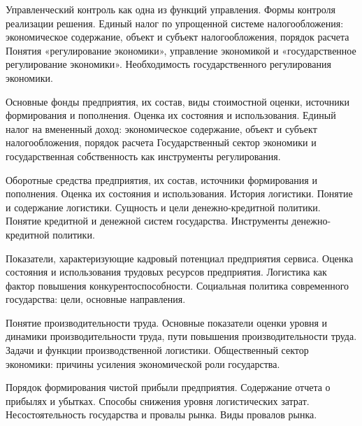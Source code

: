 \documentclass[
	11pt,
	a4paper,
	]
	{article}
\begin{document}
\bigskip

\noindent{} 
	{
		Управленческий контроль как одна из функций управления. Формы контроля реализации решения.
	}{
		Единый налог по упрощенной системе налогообложения: экономическое содержание, объект и субъект налогообложения, порядок расчета
	}{
		Понятия «регулирование экономики», управление экономикой и «государственное регулирование экономики». Необходимость государственного регулирования экономики.
	}

\bigskip

\noindent{} 
	{
		Основные фонды предприятия, их состав, виды стоимостной оценки, источники формирования и пополнения. Оценка их состояния и использования.
	}{
		Единый налог на вмененный доход: экономическое содержание, объект и субъект налогообложения, порядок расчета
	}{
		Государственный сектор экономики и государственная собственность как инструменты регулирования.
	}

\bigskip

\noindent{} 
	{
		Оборотные средства предприятия, их состав, источники формирования и пополнения. Оценка их состояния и использования.
	}{
		История логистики. Понятие и содержание логистики.
	}{
		Сущность и цели денежно-кредитной политики. Понятие кредитной и денежной систем государства. Инструменты денежно-кредитной политики.
	}

\bigskip

\noindent{} 
	{
		Показатели, характеризующие кадровый потенциал предприятия сервиса. Оценка состояния и использования трудовых ресурсов предприятия.
	}{
		Логистика как фактор повышения конкурентоспособности.
	}{
		Социальная политика современного государства: цели, основные направления.
	}

\bigskip

\noindent{} 
	{
		Понятие производительности труда. Основные показатели оценки уровня и динамики производительности труда, пути повышения производительности труда.
	}{
		Задачи и функции производственной логистики.
	}{
		Общественный сектор экономики: причины усиления экономической роли государства.
	}

\bigskip

\noindent{} 
	{
		Порядок формирования чистой прибыли предприятия. Содержание отчета о прибылях и убытках.
	}{
		Способы снижения уровня логистических затрат.
	}{
		Несостоятельность государства и провалы рынка. Виды провалов рынка.
	}

\bigskip
\end{document}

